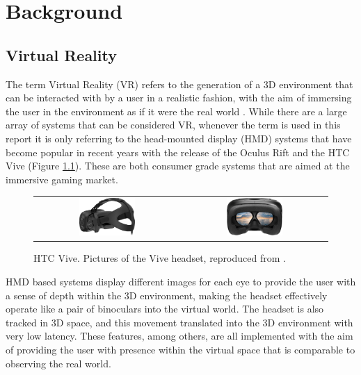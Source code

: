 \chapter{Background}

\section{Virtual Reality}

The term Virtual Reality (VR) refers to the generation of a 3D environment that can be interacted with by a user in a realistic fashion, with the aim of immersing the user in the environment as if it were the real world \cite{WhatVR}. While there are a large array of systems that can be considered VR, whenever the term is used in this report it is only referring to the head-mounted display (HMD) systems that have become popular in recent years with the release of the Oculus Rift \cite{Oculus} and the HTC Vive \cite{Vive} (Figure \ref{fig:Vive}). These are both consumer grade systems that are aimed at the immersive gaming market.

\begin{figure}[H]
    \begin{center}
    \begin{tabular}{ c c }
        \includegraphics[width=0.4\textwidth]{Figures/vive.png} &
        \includegraphics[width=0.4\textwidth]{Figures/vive2.png}
    \end{tabular}
    \caption[HTC Vive]{HTC Vive. Pictures of the Vive headset, reproduced from \cite{Vive}.}
    \label{fig:Vive}
    \end{center}
\end{figure}

HMD based systems display different images for each eye to provide the user with a sense of depth within the 3D environment, making the headset effectively operate like a pair of binoculars into the virtual world. The headset is also tracked in 3D space, and this movement translated into the 3D environment with very low latency. These features, among others, are all implemented with the aim of providing the user with presence within the virtual space that is comparable to observing the real world.

